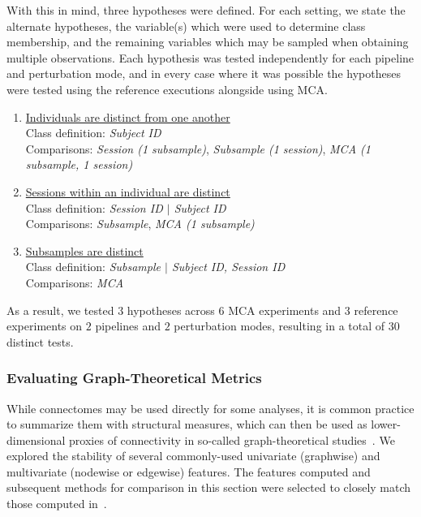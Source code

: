 \documentclass[fleqn,10pt]{SelfArx} %
\begin{document}
With this in mind, three hypotheses were defined. For each setting, we state the alternate hypotheses, the variable(s)
which were used to determine class membership, and the remaining variables which may be sampled when obtaining multiple
observations. Each hypothesis was tested independently for each pipeline and perturbation mode, and in every case where
it was possible the hypotheses were tested using the reference executions alongside using MCA.

\begin{enumerate}[label=$H_{A\arabic*}$:]
\item \underline{Individuals are distinct from one another}\\
Class definition: \textit{Subject ID}\\
Comparisons: \textit{Session (1 subsample)}, \textit{Subsample (1 session)}, \textit{MCA (1 subsample, 1 session)}
\item \underline{Sessions within an individual are distinct}\\
Class definition: \textit{Session ID $\vert$ Subject ID}\\
Comparisons: \textit{Subsample}, \textit{MCA (1 subsample)}
\item \underline{Subsamples are distinct}\\
Class definition: \textit{Subsample $\vert$ Subject ID, Session ID}\\
Comparisons: \textit{MCA}
\end{enumerate}

As a result, we tested $3$ hypotheses across $6$ MCA experiments and $3$ reference experiments on $2$ pipelines and $2$
perturbation modes, resulting in a total of $30$ distinct tests.

\subsubsection*{Evaluating Graph-Theoretical Metrics}
While connectomes may be used directly for some analyses, it is common practice to summarize them with structural
measures, which can then be used as lower-dimensional proxies of connectivity in so-called graph-theoretical
studies~\cite{Rubinov2010-fh}. We explored the stability of several commonly-used univariate (graphwise) and
multivariate (nodewise or edgewise) features. The features computed and subsequent methods for comparison in this
section were selected to closely match those computed in~\cite{Betzel2018-eo}.
\end{document}
